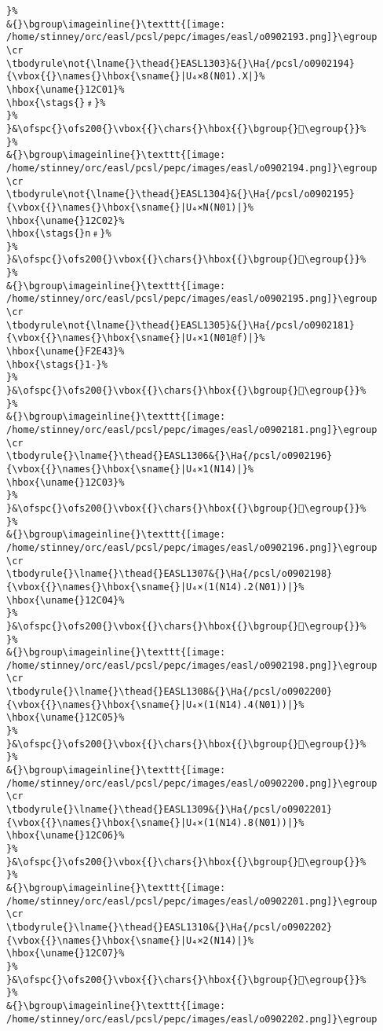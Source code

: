 \begin{verbatim}
}%
&{}\bgroup\imageinline{}\texttt{[image: /home/stinney/orc/easl/pcsl/pepc/images/easl/o0902193.png]}\egroup
\cr
\tbodyrule\not{\lname{}\thead{}EASL1303}&{}\Ha{/pcsl/o0902194}{\vbox{{}\names{}\hbox{\sname{}|U₄×8(N01).X|}%
\hbox{\uname{}12C01}%
\hbox{\stags{}﹟}%
}%
}&\ofspc{}\ofs200{}\vbox{{}\chars{}\hbox{{}\bgroup{}𒰁\egroup{}}%
}%
&{}\bgroup\imageinline{}\texttt{[image: /home/stinney/orc/easl/pcsl/pepc/images/easl/o0902194.png]}\egroup
\cr
\tbodyrule\not{\lname{}\thead{}EASL1304}&{}\Ha{/pcsl/o0902195}{\vbox{{}\names{}\hbox{\sname{}|U₄×N(N01)|}%
\hbox{\uname{}12C02}%
\hbox{\stags{}n﹟}%
}%
}&\ofspc{}\ofs200{}\vbox{{}\chars{}\hbox{{}\bgroup{}𒰂\egroup{}}%
}%
&{}\bgroup\imageinline{}\texttt{[image: /home/stinney/orc/easl/pcsl/pepc/images/easl/o0902195.png]}\egroup
\cr
\tbodyrule\not{\lname{}\thead{}EASL1305}&{}\Ha{/pcsl/o0902181}{\vbox{{}\names{}\hbox{\sname{}|U₄×1(N01@f)|}%
\hbox{\uname{}F2E43}%
\hbox{\stags{}1-}%
}%
}&\ofspc{}\ofs200{}\vbox{{}\chars{}\hbox{{}\bgroup{}󲹃\egroup{}}%
}%
&{}\bgroup\imageinline{}\texttt{[image: /home/stinney/orc/easl/pcsl/pepc/images/easl/o0902181.png]}\egroup
\cr
\tbodyrule{}\lname{}\thead{}EASL1306&{}\Ha{/pcsl/o0902196}{\vbox{{}\names{}\hbox{\sname{}|U₄×1(N14)|}%
\hbox{\uname{}12C03}%
}%
}&\ofspc{}\ofs200{}\vbox{{}\chars{}\hbox{{}\bgroup{}𒰃\egroup{}}%
}%
&{}\bgroup\imageinline{}\texttt{[image: /home/stinney/orc/easl/pcsl/pepc/images/easl/o0902196.png]}\egroup
\cr
\tbodyrule{}\lname{}\thead{}EASL1307&{}\Ha{/pcsl/o0902198}{\vbox{{}\names{}\hbox{\sname{}|U₄×(1(N14).2(N01))|}%
\hbox{\uname{}12C04}%
}%
}&\ofspc{}\ofs200{}\vbox{{}\chars{}\hbox{{}\bgroup{}𒰄\egroup{}}%
}%
&{}\bgroup\imageinline{}\texttt{[image: /home/stinney/orc/easl/pcsl/pepc/images/easl/o0902198.png]}\egroup
\cr
\tbodyrule{}\lname{}\thead{}EASL1308&{}\Ha{/pcsl/o0902200}{\vbox{{}\names{}\hbox{\sname{}|U₄×(1(N14).4(N01))|}%
\hbox{\uname{}12C05}%
}%
}&\ofspc{}\ofs200{}\vbox{{}\chars{}\hbox{{}\bgroup{}𒰅\egroup{}}%
}%
&{}\bgroup\imageinline{}\texttt{[image: /home/stinney/orc/easl/pcsl/pepc/images/easl/o0902200.png]}\egroup
\cr
\tbodyrule{}\lname{}\thead{}EASL1309&{}\Ha{/pcsl/o0902201}{\vbox{{}\names{}\hbox{\sname{}|U₄×(1(N14).8(N01))|}%
\hbox{\uname{}12C06}%
}%
}&\ofspc{}\ofs200{}\vbox{{}\chars{}\hbox{{}\bgroup{}𒰆\egroup{}}%
}%
&{}\bgroup\imageinline{}\texttt{[image: /home/stinney/orc/easl/pcsl/pepc/images/easl/o0902201.png]}\egroup
\cr
\tbodyrule{}\lname{}\thead{}EASL1310&{}\Ha{/pcsl/o0902202}{\vbox{{}\names{}\hbox{\sname{}|U₄×2(N14)|}%
\hbox{\uname{}12C07}%
}%
}&\ofspc{}\ofs200{}\vbox{{}\chars{}\hbox{{}\bgroup{}𒰇\egroup{}}%
}%
&{}\bgroup\imageinline{}\texttt{[image: /home/stinney/orc/easl/pcsl/pepc/images/easl/o0902202.png]}\egroup

\end{verbatim}
